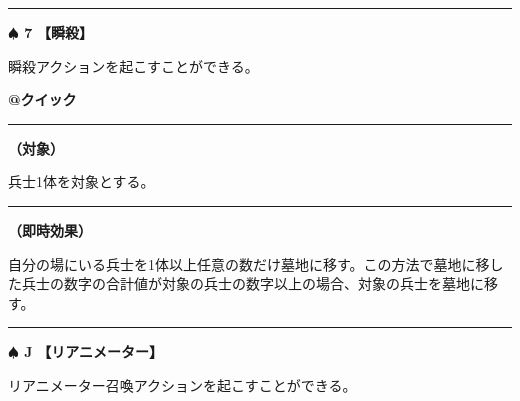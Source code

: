 \documentclass[twocolumn,a5paper,papersize,10pt]{jarticle}
\begin{document}
\vspace{-1zh}
  
 

\vspace{3mm} %
\hrule height 0.5mm depth 0mm width 66.5mm %
\vspace{1mm} %
{\Large\bf $\spadesuit$ 7} {\normalsize\bf【瞬殺】} %
\vspace{1mm} %

瞬殺アクションを起こすことができる。

\begin{tcolorbox}[title={\small\bf【Action】瞬殺}{\scriptsize （速攻魔法）}]

{\scriptsize\bf @クイック }

\vspace{1mm} %
\hrule height 0.1mm depth 0mm width 62mm %
\vspace{1mm} %

{\bf（対象）}

兵士1体を対象とする。

\vspace{1mm} %
\hrule height 0.1mm depth 0mm width 62mm %
\vspace{1mm} %

{\bf（即時効果）}

自分の場にいる兵士を1体以上任意の数だけ墓地に移す。この方法で墓地に移した兵士の数字の合計値が対象の兵士の数字以上の場合、対象の兵士を墓地に移す。

\vspace{1mm} %
\end{tcolorbox}

\vspace{-1zh}
  
 

\vspace{3mm} %
\hrule height 0.5mm depth 0mm width 66.5mm %
\vspace{1mm} %
{\Large\bf $\spadesuit$ J} {\normalsize\bf【リアニメーター】} %
\vspace{1mm} %

リアニメーター召喚アクションを起こすことができる。
\end{document}
